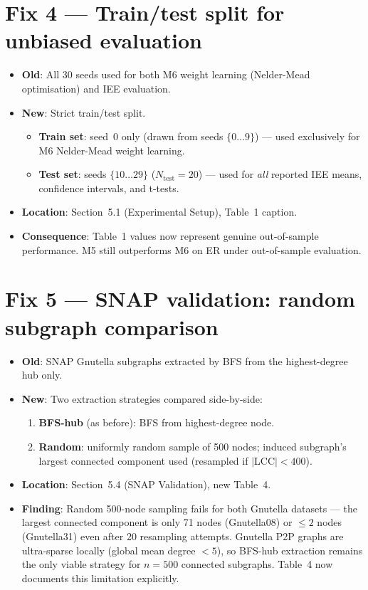 \documentclass[11pt,a4paper]{article}
\begin{document}
\section*{Fix 4 — Train/test split for unbiased evaluation}

\begin{itemize}
\item \textbf{Old}: All 30 seeds used for both M6 weight learning
  (Nelder-Mead optimisation) and IEE evaluation.
\item \textbf{New}: Strict train/test split.
  \begin{itemize}
  \item \textbf{Train set}: seed~0 only (drawn from seeds $\{0\ldots9\}$)
    — used exclusively for M6 Nelder-Mead weight learning.
  \item \textbf{Test set}: seeds $\{10\ldots29\}$ ($N_{\mathrm{test}} = 20$)
    — used for \emph{all} reported IEE means, confidence intervals, and t-tests.
  \end{itemize}
\item \textbf{Location}: Section~5.1 (Experimental Setup), Table~1 caption.
\item \textbf{Consequence}: Table~1 values now represent genuine
  out-of-sample performance.  M5 still outperforms M6 on ER
  under out-of-sample evaluation.
\end{itemize}

\section*{Fix 5 — SNAP validation: random subgraph comparison}

\begin{itemize}
\item \textbf{Old}: SNAP Gnutella subgraphs extracted by BFS from the
  highest-degree hub only.
\item \textbf{New}: Two extraction strategies compared side-by-side:
  \begin{enumerate}
  \item \textbf{BFS-hub} (as before): BFS from highest-degree node.
  \item \textbf{Random}: uniformly random sample of 500 nodes; induced
    subgraph's largest connected component used (resampled if $|$LCC$| < 400$).
  \end{enumerate}
\item \textbf{Location}: Section~5.4 (SNAP Validation), new Table~4.
\item \textbf{Finding}: Random 500-node sampling fails for both Gnutella
  datasets — the largest connected component is only 71 nodes (Gnutella08)
  or $\leq 2$ nodes (Gnutella31) even after 20 resampling attempts.
  Gnutella P2P graphs are ultra-sparse locally (global mean degree $< 5$),
  so BFS-hub extraction remains the only viable strategy for $n=500$
  connected subgraphs.  Table~4 now documents this limitation explicitly.
\end{itemize}
\end{document}

